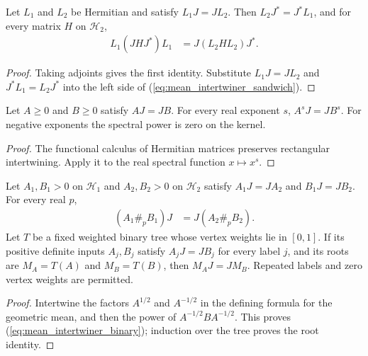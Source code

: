 \begin{theorem}
\label{thm:mean_intertwiner_sandwich}
\leanok
Let $L_1$ and $L_2$ be Hermitian and satisfy $L_1J=JL_2$.
Then $L_2J^*=J^*L_1$, and for every matrix $H$ on $\mathcal H_2$,
\begin{align}
 L_1(JHJ^*)L_1&=J(L_2HL_2)J^*.
 \label{eq:mean_intertwiner_sandwich}
\end{align}
\end{theorem}
\begin{proof}\leanok
Taking adjoints gives the first identity. Substitute $L_1J=JL_2$ and
$J^*L_1=L_2J^*$ into the left side of
(\ref{eq:mean_intertwiner_sandwich}).
\end{proof}

\begin{theorem}
\label{thm:mean_intertwiner_power}
\leanok
Let $A\ge0$ and $B\ge0$ satisfy $AJ=JB$. For every real exponent $s$,
$A^sJ=JB^s$. For negative exponents the spectral power is zero on the kernel.
\end{theorem}
\begin{proof}\leanok
The functional calculus of Hermitian matrices preserves rectangular
intertwining. Apply it to the real spectral function $x\mapsto x^s$.
\end{proof}

\begin{theorem}
\label{thm:mean_intertwiner_root}
\leanok
{}
Let $A_1,B_1>0$ on $\mathcal H_1$ and $A_2,B_2>0$ on $\mathcal H_2$ satisfy
$A_1J=JA_2$ and $B_1J=JB_2$. For every real $p$,
\begin{align}
 (A_1\#_pB_1)J&=J(A_2\#_pB_2).
 \label{eq:mean_intertwiner_binary}
\end{align}
Let $T$ be a fixed weighted binary tree whose vertex weights lie in $[0,1]$.
If its positive definite inputs $A_j,B_j$ satisfy $A_jJ=JB_j$ for every
label $j$, and its roots are $M_A=T(A)$ and $M_B=T(B)$, then $M_AJ=JM_B$.
Repeated labels and zero vertex weights are permitted.
\end{theorem}
\begin{proof}\leanok
{}
Intertwine the factors $A^{1/2}$ and $A^{-1/2}$ in the defining formula for
the geometric mean, and then the power of $A^{-1/2}BA^{-1/2}$. This proves
(\ref{eq:mean_intertwiner_binary}); induction over the tree proves the root
identity.
\end{proof}

